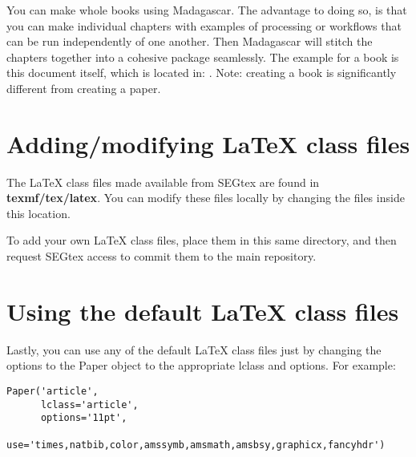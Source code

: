 You can make whole books using Madagascar.  The advantage to doing so, is that you can make individual chapters with examples of processing or workflows that can be run independently of one another.  Then Madagascar will stitch the chapters together into a cohesive package seamlessly.  The example for a book is this document itself, which is located in: \textbf{\maindir}.  Note: creating a book is significantly different from creating a paper.

\section{Adding/modifying LaTeX class files}

The LaTeX class files made available from SEGtex are found in \textbf{texmf/tex/latex}.  You can modify these files locally by changing the files inside this location.  

To add your own LaTeX class files, place them in this same directory, and then request SEGtex access to commit them to the main repository.

\section{Using the default LaTeX class files}

Lastly, you can use any of the default LaTeX class files just by changing the options to the Paper object to the appropriate lclass and options. For example:
\begin{verbatim}
Paper('article',
      lclass='article',
      options='11pt',
      use='times,natbib,color,amssymb,amsmath,amsbsy,graphicx,fancyhdr')
\end{verbatim}